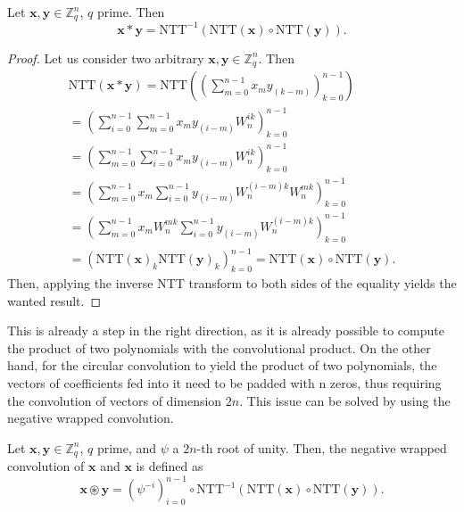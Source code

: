 \begin{theorem}
Let $\mathbf{x},\mathbf{y}\in\mathbb{Z}_q^n$, $q$ prime. Then
\begin{equation*}
\mathbf{x}\ast\mathbf{y} = \mathrm{NTT}^{-1}(\mathrm{NTT}(\mathbf{x}) \circ \mathrm{NTT}(\mathbf{y})).
\end{equation*}
\end{theorem}
\begin{proof}
Let us consider two arbitrary $\mathbf{x},\mathbf{y}\in\mathbb{Z}_q^n$. Then
\begin{equation*}
\begin{aligned}
\mathrm{NTT}(\mathbf{x}\ast\mathbf{y}) = \mathrm{NTT}\left(\left(\sum_{m=0}^{n-1}x_{m}y_{(k-m)}\right)_{k=0}^{n-1}\right)\\
= \left(\sum_{i=0}^{n-1}\sum_{m=0}^{n-1}x_my_{(i-m)}W_n^{ik}\right)_{k=0}^{n-1}\\
= \left(\sum_{m=0}^{n-1}\sum_{i=0}^{n-1}x_my_{(i-m)}W_n^{ik}\right)_{k=0}^{n-1}\\
= \left(\sum_{m=0}^{n-1}x_m\sum_{i=0}^{n-1}y_{(i-m)}W_n^{(i-m)k}W_n^{mk}\right)_{k=0}^{n-1}\\
= \left(\sum_{m=0}^{n-1}x_mW_n^{mk}\sum_{i=0}^{n-1}y_{(i-m)}W_n^{(i-m)k}\right)_{k=0}^{n-1}\\
= \left(\mathrm{NTT}(\mathbf{x})_k\mathrm{NTT}(\mathbf{y})_k\right)_{k=0}^{n-1} = \mathrm{NTT}(\mathbf{x})\circ \mathrm{NTT}(\mathbf{y}).
\end{aligned}
\end{equation*}
Then, applying the inverse NTT transform to both sides of the equality yields the wanted result.
\end{proof}

This is already a step in the right direction, as it is already possible to compute the product of two polynomials with the convolutional product. On the other hand, for the circular convolution to yield the product of two polynomials, the vectors of coefficients fed into it need to be padded with n zeros, thus requiring the convolution of vectors of dimension $2n$. This issue can be solved by using the negative wrapped convolution.

\begin{definition}
Let $\mathbf{x},\mathbf{y}\in\mathbb{Z}_q^n$, $q$ prime, and $\psi$ a $2n$-th root of unity. Then, the negative wrapped convolution of $\mathbf{x}$ and $\mathbf{x}$ is defined as
\begin{equation*}
\mathbf{x}\circledast\mathbf{y} = (\psi^{-i})_{i=0}^{n-1}\circ \mathrm{NTT}^{-1}(\mathrm{NTT}(\mathbf{x})\circ \mathrm{NTT}(\mathbf{y})).
\end{equation*}
\end{definition}

